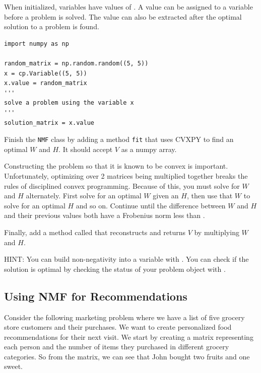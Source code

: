 When initialized, variables have values of .
A value can be assigned to a variable before a problem is solved.
The value can also be extracted after the optimal solution to a problem is found.
\begin{lstlisting}
import numpy as np

random_matrix = np.random.random((5, 5))
x = cp.Variable((5, 5))
x.value = random_matrix
'''
solve a problem using the variable x
'''
solution_matrix = x.value
\end{lstlisting}



\begin{problem}
Finish the \texttt{NMF} class by adding a method \texttt{fit} that uses CVXPY to find an optimal $W$ and $H$.
It should accept $V$ as a numpy array.

Constructing the problem so that it is known to be convex is important.
Unfortunately, optimizing over 2 matrices being multiplied together breaks the rules of disciplined convex programming.
Because of this, you must solve for $W$ and $H$ alternately. First solve for an optimal $W$ given an $H$, then use that $W$ to solve for an optimal $H$ and so on. Continue until the difference between $W$ and $H$ and their previous values both have a Frobenius norm less than .

Finally, add a method called  that reconstructs and returns $V$ by multiplying $W$ and $H$.

HINT: You can build non-negativity into a  variable with .
You can check if the solution is optimal by checking the status of your problem object with .
\end{problem}


\subsection*{Using NMF for Recommendations}

Consider the following marketing problem where we have a list of five grocery store customers and their purchases.
We want to create personalized food recommendations for their next visit.
We start by creating a matrix representing each person and the number of items they purchased in different grocery categories.
So from the matrix, we can see that John bought two fruits and one sweet.
%

